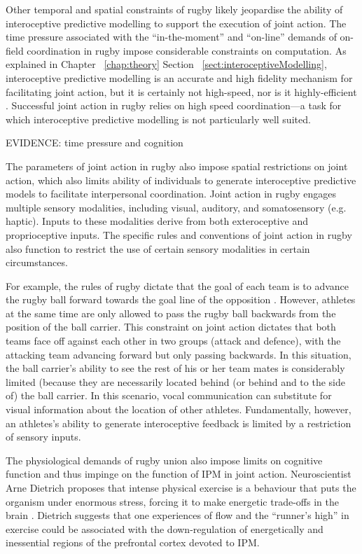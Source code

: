 \begin{CJK}{UTF8}{gbsn}
Other temporal and spatial constraints of rugby likely jeopardise the ability of interoceptive predictive modelling to support the execution of joint action.  The time pressure associated with the ``in-the-moment'' and ``on-line'' demands of on-field coordination in rugby impose considerable constraints on computation.  As explained in Chapter ~\ref{chap:theory} Section ~\ref{sect:interoceptiveModelling}, interoceptive predictive modelling is an accurate and high fidelity mechanism for facilitating joint action, but it is certainly not high-speed, nor is it highly-efficient \citep{Kahneman2011}. Successful joint action in rugby relies on high speed coordination---a task for which interoceptive predictive modelling is not particularly well suited.

EVIDENCE: time pressure and cognition

The parameters of joint action in rugby also impose spatial restrictions on joint action, which also limits ability of individuals to generate interoceptive predictive models to facilitate interpersonal coordination. Joint action in rugby engages multiple sensory modalities, including visual, auditory, and somatosensory (e.g. haptic).  Inputs to these modalities derive from both exteroceptive and proprioceptive inputs.  The specific rules and conventions of joint action in rugby also function to restrict the use of certain sensory modalities in certain circumstances.

For example, the rules of rugby dictate that the goal of each team is to advance the rugby ball forward towards the goal line of the opposition \citep{IRB2014}. However, athletes at the same time are only allowed to pass the rugby ball backwards from the position of the ball carrier.  This constraint on joint action dictates that both teams face off against each other in two groups (attack and defence), with the attacking team advancing forward but only passing backwards.  In this situation, the ball carrier's ability to see the rest of his or her team mates is considerably limited (because they are necessarily located behind (or behind and to the side of) the ball carrier.  In this scenario, vocal communication can substitute for visual information about the location of other athletes.  Fundamentally, however, an athletes's ability to generate interoceptive feedback is limited by a restriction of sensory inputs.

The physiological demands of rugby union also impose limits on cognitive function and thus impinge on the function of IPM in joint action.  Neuroscientist Arne Dietrich proposes that intense physical exercise is a behaviour that puts the organism under enormous stress, forcing it to make energetic trade-offs in the brain \citep{Dietrich2004b,Dietrich2011}.  Dietrich suggests that one experiences of flow and the ``runner's high'' in exercise could be associated with the down-regulation of energetically and inessential regions of the prefrontal cortex devoted to IPM.


\end{CJK}
